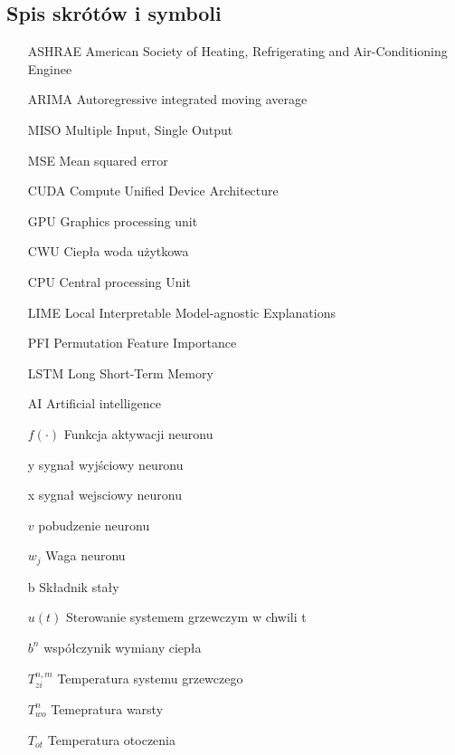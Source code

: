 \documentclass[a4paper,twoside,12pt]{book}
\begin{document}
\backmatter



\printbibliography           %

\begin{appendices}

  \chapter{Spis skrótów i symboli}

  \begin{itemize}
    \item[ASHRAE] American Society of Heating, Refrigerating and Air-Conditioning Enginee
    \item[ARIMA] Autoregressive integrated moving average
    \item[MISO] Multiple Input, Single Output
    \item[MSE] Mean squared error
    \item[CUDA] Compute Unified Device Architecture
    \item[GPU] Graphics processing unit
    \item[CWU] Ciepła woda użytkowa
    \item[CPU] Central processing Unit
    \item[LIME] Local Interpretable Model-agnostic Explanations
    \item[PFI] Permutation Feature Importance
    \item[LSTM] Long Short-Term Memory
    \item[AI] Artificial intelligence
    \item[$f(\cdot)$] Funkcja aktywacji neuronu
    \item[y] sygnał wyjściowy neuronu
    \item[x] sygnał wejsciowy neuronu
    \item[$v$] pobudzenie neuronu
    \item[$w_j$]  Waga neuronu
    \item[b] Składnik stały
    \item[$u(t)$] Sterowanie systemem grzewczym w chwili t
    \item[$b^n$] współczynik wymiany ciepła
    \item[$T_{zi}^{n,m}$] Temperatura systemu grzewczego
    \item[$T_{wo}^{n}$] Temepratura warsty
    \item[$T_{ot}$] Temperatura otoczenia

\end{itemize}
\end{appendices}
\end{document}
